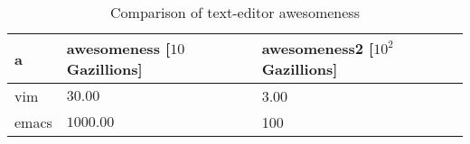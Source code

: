 \begin{table}[htp]
\centering
\label{tab:awesomeness}
\begin{tabular}{lll}
\toprule
a 	 & awesomeness [$10$ Gazillions] 	 & awesomeness2 [$10^2$ Gazillions] \\
\midrule
vim 	 & $30.00$ 	 & 3.00 \\ 	 %
emacs 	 & $1000.00$ 	 & 100 \\ 	 %
\bottomrule
\end{tabular}
\caption{Comparison of text-editor awesomeness}
\end{table}